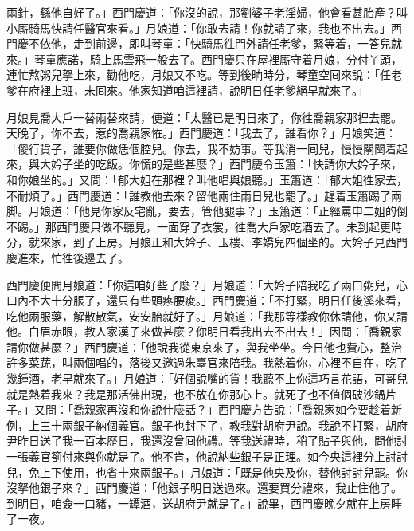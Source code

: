 兩針，繇他自好了。」西門慶道：「你沒的說，那劉婆子老淫婦，他會看甚胎產？叫小厮騎馬快請任醫官來看。」月娘道：「你敢去請！你就請了來，我也不出去。」西門慶不依他，走到前邊，即叫琴童：「快騎馬徃門外請任老爹，緊等着，一答兒就來。」琴童應諾，騎上馬雲飛一般去了。西門慶只在屋裡厮守着月娘，分付丫頭，連忙熬粥兒拏上來，勸他吃，月娘又不吃。等到後晌時分，琴童空囘來說：「任老爹在府裡上班，未囘來。他家知道咱這裡請，說明日任老爹絕早就來了。」

月娘見喬大戶一替兩替來請，便道：「太醫已是明日來了，你徃喬親家那裡去罷。天晚了，你不去，惹的喬親家恠。」西門慶道：「我去了，誰看你？」月娘笑道：「傻行貨子，誰要你做恁個腔兒。你去，我不妨事。等我消一囘兒，慢慢䦛䦟着起來，與大妗子坐的吃飯。你慌的是些甚麼？」西門慶令玉簫：「快請你大妗子來，和你娘坐的。」又問：「郁大姐在那裡？叫他唱與娘聽。」玉簫道：「郁大姐徃家去，不耐煩了。」西門慶道：「誰教他去來？留他兩住兩日兒也罷了。」趕着玉簫踢了兩脚。月娘道：「他見你家反宅亂，要去，管他腿事？」玉簫道：「正經罵申二姐的倒不踢。」{}那西門慶只做不聽見，一面穿了衣裳，徃喬大戶家吃酒去了。未到起更時分，就來家，到了上房。月娘正和大妗子、玉樓、李嬌兒四個坐的。大妗子見西門慶進來，忙徃後邊去了。

西門慶便問月娘道：「你這咱好些了麼？」月娘道：「大妗子陪我吃了兩口粥兒，心口內不大十分脹了，還只有些頭疼腰痠。」西門慶道：「不打緊，明日任後溪來看，吃他兩服藥，解散散氣，安安胎就好了。」月娘道：「我那等樣教你休請他，你又請他。白眉赤眼，教人家漢子來做甚麼？你明日看我出去不出去！」因問：「喬親家請你做甚麼？」西門慶道：「他說我從東京來了，與我坐坐。今日他也費心，整治許多菜蔬，叫兩個唱的，落後又邀過朱臺官來陪我。我熱着你，心裡不自在，吃了幾鍾酒，老早就來了。」月娘道：「好個說嘴的貨！我聽不上你這巧言花語，可哥兒就是熱着我來？我是那活佛出現，也不放在你那心上。就死了也不值個破沙鍋片子。」又問：「喬親家再沒和你說什麼話？」西門慶方告說：「喬親家如今要趁着新例，上三十兩銀子納個義官。銀子也封下了，教我對胡府尹說。我說不打緊，胡府尹昨日送了我一百本歷日，我還沒曾囘他禮。等我送禮時，稍了貼子與他，問他討一張義官箚付來與你就是了。他不肯，他說納些銀子是正理。如今央這裡分上討討兒，免上下使用，也省十來兩銀子。」月娘道：「既是他央及你，替他討討兒罷。你沒拏他銀子來？」西門慶道：「他銀子明日送過來。還要買分禮來，我止住他了。到明日，咱僉一口豬，一罈酒，送胡府尹就是了。」說畢，西門慶晚夕就在上房睡了一夜。

